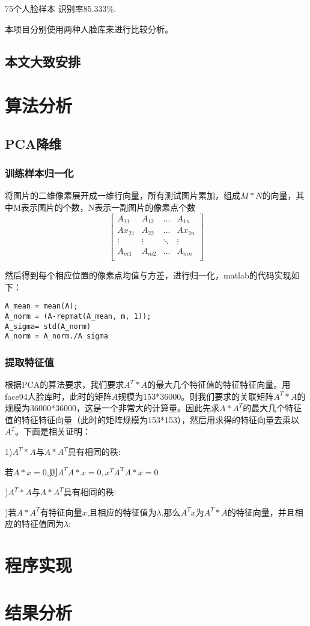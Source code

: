 \documentclass{ctexart}
\begin{document}
75个人脸样本 识别率85.333\%.


本项目分别使用两种人脸库来进行比较分析。

\subsection{本文大致安排}



\section{算法分析}

\subsection{PCA降维}

\subsubsection{训练样本归一化}

将图片的二维像素展开成一维行向量，所有测试图片累加，组成$M*N$的向量，其中M表示图片的个数，N表示一副图片的像素点个数
\[
\begin{bmatrix}
A_{11} & A_{12} & \ldots & A_{1n}\\
Ax_{21} & A_{22} & \ldots & Ax_{2n}\\
\vdots & \vdots & \ddots & \vdots\\
A_{m1} & A_{m2} & \ldots & A_{mn}\\
\end{bmatrix}
\]

然后得到每个相应位置的像素点均值与方差，进行归一化，matlab的代码实现如下：

\begin{lstlisting}
A_mean = mean(A);
A_norm = (A-repmat(A_mean, m, 1));
A_sigma= std(A_norm)
A_norm = A_norm./A_sigma
\end{lstlisting}

\subsubsection{提取特征值}

根据PCA的算法要求，我们要求$A^T*A$的最大几个特征值的特征特征向量。用face94人脸库时，此时的矩阵$A$规模为153*36000。则我们要求的关联矩阵$A^T*A$的规模为36000*36000，这是一个非常大的计算量。因此先求$A*A^T$的最大几个特征值的特征特征向量（此时的矩阵规模为153*153），然后用求得的特征向量去乘以$A^T$。下面是相关证明：

1)$A^T*A$与$A*A^T$具有相同的秩:

若$A*x=0$,则$A^TA*x=0, x^TA^\mathrm{T}A*x=0 $

)$A^T*A$与$A*A^T$具有相同的秩:

)若$A*A^T$有特征向量$x$,且相应的特征值为$\lambda$,那么$A^Tx$为$A^T*A$的特征向量，并且相应的特征值同为$\lambda$:

\section{程序实现}

\section{结果分析}
\end{document}
